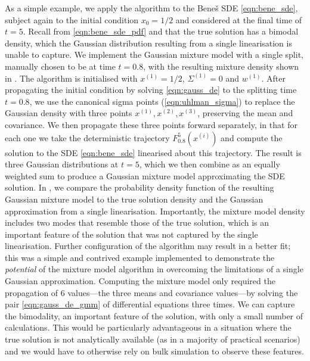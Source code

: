 As a simple example, we apply the algorithm to the Bene\v{s} SDE \cref{eqn:bene_sde}, subject again to the initial condition \(x_0 = 1/2\) and considered at the final time of \(t = 5\).
Recall from \cref{eqn:bene_sde_pdf} and  that the true solution has a bimodal density, which the Gaussian distribution resulting from a single linearisation is unable to capture.
We implement the Gaussian mixture model with a single split, manually chosen to be at time \(t = 0.8\), with the resulting mixture density shown in .
The algorithm is initialised with \(x^{(1)} = 1/2\), \(\Sigma^{(1)} = 0\) and \(w^{(1)}\).
After propagating the initial condition by solving \cref{eqn:gauss_de} to the splitting time \(t = 0.8\), we use the canonical sigma points (\cref{eqn:uhlman_sigma}) to replace the Gaussian density with three points \(x^{(1)}, x^{(2)}, x^{(3)}\), preserving the mean and covariance.
We then propagate these three points forward separately, in that for each one we take the deterministic trajectory \(F_{0.8}^{5}\!\left(x^{(i)}\right)\) and compute the solution to the SDE \cref{eqn:bene_sde} linearised about this trajectory.
The result is three Gaussian distributions at \(t = 5\), which we then combine as an equally weighted sum to produce a Gaussian mixture model approximating the SDE solution.
In , we compare the probability density function of the resulting Gaussian mixture model to the true solution density and the Gaussian approximation from a single linearisation.
Importantly, the mixture model density includes two modes that resemble those of the true solution, which is an important feature of the solution that was not captured by the single linearisation.
Further configuration of the algorithm may result in a better fit; this was a simple and contrived example implemented to demonstrate the \emph{potential} of the mixture model algorithm in overcoming the limitations of a single Gaussian approximation.
Computing the mixture model only required the propagation of 6 values---the three means and covariance values---by solving the pair \cref{eqn:gauss_de_gmm} of differential equations three times.
We can capture the bimodality, an important feature of the solution, with only a small number of calculations.
This would be particularly advantageous in a situation where the true solution is not analytically available (as in a majority of practical scenarios) and we would have to otherwise rely on bulk simulation to observe these features.




